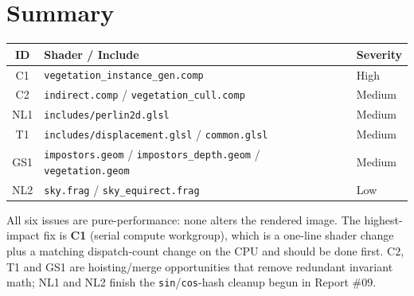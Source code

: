 \documentclass[a4paper,12pt]{article}
\begin{document}
\newpage

\section{Summary}

\begin{center}
\begin{tabular}{cll}
\toprule
\textbf{ID} & \textbf{Shader / Include} & \textbf{Severity} \\
\midrule
C1  & \texttt{vegetation\_instance\_gen.comp}        & High   \\
C2  & \texttt{indirect.comp} / \texttt{vegetation\_cull.comp} & Medium \\
NL1 & \texttt{includes/perlin2d.glsl}               & Medium \\
T1  & \texttt{includes/displacement.glsl} / \texttt{common.glsl} & Medium \\
GS1 & \texttt{impostors.geom} / \texttt{impostors\_depth.geom} / \texttt{vegetation.geom} & Medium \\
NL2 & \texttt{sky.frag} / \texttt{sky\_equirect.frag} & Low \\
\bottomrule
\end{tabular}
\end{center}

All six issues are pure-performance: none alters the rendered image. The
highest-impact fix is \textbf{C1} (serial compute workgroup), which is a
one-line shader change plus a matching dispatch-count change on the CPU and
should be done first. C2, T1 and GS1 are hoisting/merge opportunities that
remove redundant invariant math; NL1 and NL2 finish the
\texttt{sin}/\texttt{cos}-hash cleanup begun in Report \#09.
\end{document}
